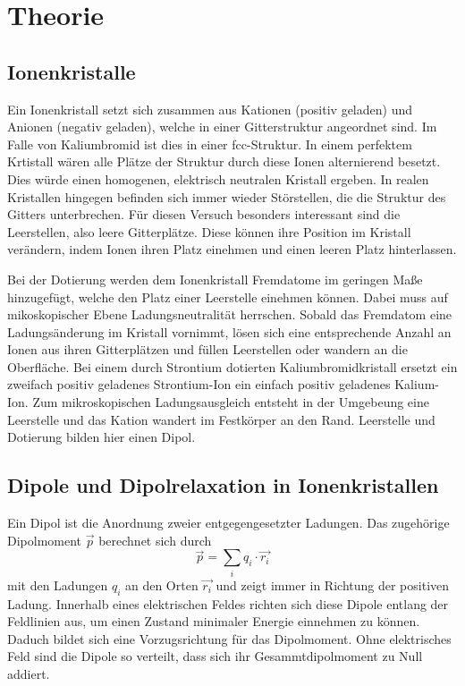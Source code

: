 \section{Theorie}
\label{sec:Theorie}



\subsection{Ionenkristalle}
Ein Ionenkristall setzt sich zusammen aus Kationen (positiv geladen) und Anionen (negativ geladen),
welche in einer Gitterstruktur angeordnet sind. Im Falle von Kaliumbromid ist dies in einer fcc-Struktur.
In einem perfektem Krtistall wären alle Plätze der Struktur durch diese Ionen alternierend besetzt.
Dies würde einen homogenen, elektrisch neutralen Kristall ergeben.
In realen Kristallen hingegen befinden sich immer wieder Störstellen,
die die Struktur des Gitters unterbrechen.
Für diesen Versuch besonders interessant sind die Leerstellen,
also leere Gitterplätze.
Diese können ihre Position im Kristall verändern,
indem Ionen ihren Platz einehmen und einen leeren Platz hinterlassen.

Bei der Dotierung werden dem Ionenkristall Fremdatome im geringen Maße hinzugefügt,
welche den Platz einer Leerstelle einehmen können.
Dabei muss auf mikoskopischer Ebene Ladungsneutralität herrschen.
Sobald das Fremdatom eine Ladungsänderung im Kristall vornimmt,
lösen sich eine entsprechende Anzahl an Ionen aus ihren Gitterplätzen und füllen Leerstellen
oder wandern an die Oberfläche.
Bei einem durch Strontium dotierten Kaliumbromidkristall
ersetzt ein zweifach positiv geladenes Strontium-Ion ein einfach positiv geladenes Kalium-Ion.
Zum mikroskopischen Ladungsausgleich entsteht in der Umgebeung eine Leerstelle 
und das Kation wandert im Festkörper an den Rand.
Leerstelle und Dotierung bilden hier einen Dipol.



\subsection{Dipole und Dipolrelaxation in Ionenkristallen}
Ein Dipol ist die Anordnung zweier entgegengesetzter Ladungen.
Das zugehörige Dipolmoment $\vec{p}$ berechnet sich durch
\begin{equation*}
    \vec{p} = \sum_i q_i \cdot \vec{r_i}
\end{equation*}
mit den Ladungen $q_i$ an den Orten $\vec{r_i}$ 
und zeigt immer in Richtung der positiven Ladung.
Innerhalb eines elektrischen Feldes richten sich diese Dipole entlang der Feldlinien aus,
um einen Zustand minimaler Energie einnehmen zu können.
Daduch bildet sich eine Vorzugsrichtung für das Dipolmoment.
Ohne elektrisches Feld sind die Dipole so verteilt, 
dass sich ihr Gesammtdipolmoment zu Null addiert.

